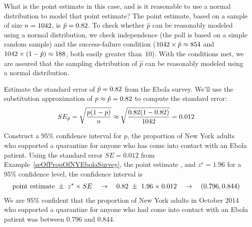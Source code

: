 \begin{examplewrap}
\begin{nexample}{What is the point estimate in this case,
    and is it reasonable to
    use a normal distribution to model that point estimate?}
  The point estimate, based on a sample of size $n = 1042{}$,
  is $\hat{p} = 0.82{}$.
  To check whether $\hat{p}$ can be reasonably
  modeled using a normal distribution, we check independence
  (the poll is based on a simple random sample) and the
  success-failure condition
  ($1042{} \times \hat{p} \approx 854{}$
  and $1042{} \times (1 - \hat{p})
      \approx 188{}$,
  both easily greater than~10).
  With the conditions met, we are assured
  that the sampling distribution of $\hat{p}$ can be
  reasonably modeled using a normal distribution.
\end{nexample}
\end{examplewrap}

\begin{examplewrap}
\begin{nexample}{Estimate the standard error of
    $\hat{p} = 0.82{}$ from the Ebola survey.}
  \label{seOfPropOfNYEbolaSurvey}%
  We'll use the substitution approximation of
  $p \approx \hat{p} = 0.82{}$ to compute
  the standard error:
  \begin{align*}
  SE_{\hat{p}}
    = \sqrt{\frac{p(1-p)}{n}}
    \approx \sqrt{\frac{0.82{}
        (1 - 0.82{})}{1042{}}}
    = 0.012{}
  \end{align*}
\end{nexample}
\end{examplewrap}

\begin{examplewrap}
\begin{nexample}{Construct a 95\% confidence interval for $p$,
    the proportion of New York adults who supported a quarantine
    for anyone who has come into contact with an Ebola patient.}
  \label{ex_ci_ny_ebola_quarantine}%
  Using the standard error $SE = 0.012$ from
  Example~\ref{seOfPropOfNYEbolaSurvey},
  the point estimate \wsjebolapollprop{}, and $z^{\star} = 1.96$
  for a 95\% confidence level, the confidence interval is
  \begin{eqnarray*}
  \text{point estimate} \ \pm\ z^{\star} \times SE
    \quad\to\quad 0.82{} \ \pm\ 1.96\times 0.012{}
    \quad\to\quad (0.796, 0.844)
  \end{eqnarray*}
  We are 95\% confident that the proportion of New York adults
  in October 2014 who supported a quarantine for anyone who had come
  into contact with an Ebola patient was between 0.796 and 0.844.
\end{nexample}
\end{examplewrap}

